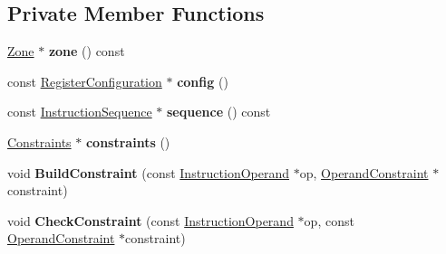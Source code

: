\subsection*{Private Member Functions}
\begin{DoxyCompactItemize}
\item 
\hyperlink{classv8_1_1internal_1_1_zone}{Zone} $\ast$ {\bfseries zone} () const \hypertarget{classv8_1_1internal_1_1compiler_1_1_register_allocator_verifier_a4906ddee483016d5bf8f46fd077032f7}{}\label{classv8_1_1internal_1_1compiler_1_1_register_allocator_verifier_a4906ddee483016d5bf8f46fd077032f7}

\item 
const \hyperlink{classv8_1_1internal_1_1_register_configuration}{Register\+Configuration} $\ast$ {\bfseries config} ()\hypertarget{classv8_1_1internal_1_1compiler_1_1_register_allocator_verifier_ae467b5a1da6be846a0c76ad7051b150e}{}\label{classv8_1_1internal_1_1compiler_1_1_register_allocator_verifier_ae467b5a1da6be846a0c76ad7051b150e}

\item 
const \hyperlink{classv8_1_1internal_1_1compiler_1_1_instruction_sequence}{Instruction\+Sequence} $\ast$ {\bfseries sequence} () const \hypertarget{classv8_1_1internal_1_1compiler_1_1_register_allocator_verifier_a3f184dbb2f398b72cb6ab80ada2e0baf}{}\label{classv8_1_1internal_1_1compiler_1_1_register_allocator_verifier_a3f184dbb2f398b72cb6ab80ada2e0baf}

\item 
\hyperlink{classv8_1_1internal_1_1_zone_vector}{Constraints} $\ast$ {\bfseries constraints} ()\hypertarget{classv8_1_1internal_1_1compiler_1_1_register_allocator_verifier_a51dda432132992020f0405a173bc87fd}{}\label{classv8_1_1internal_1_1compiler_1_1_register_allocator_verifier_a51dda432132992020f0405a173bc87fd}

\item 
void {\bfseries Build\+Constraint} (const \hyperlink{classv8_1_1internal_1_1compiler_1_1_instruction_operand}{Instruction\+Operand} $\ast$op, \hyperlink{structv8_1_1internal_1_1compiler_1_1_register_allocator_verifier_1_1_operand_constraint}{Operand\+Constraint} $\ast$constraint)\hypertarget{classv8_1_1internal_1_1compiler_1_1_register_allocator_verifier_abf7773216181a4e5da1f4392144012e7}{}\label{classv8_1_1internal_1_1compiler_1_1_register_allocator_verifier_abf7773216181a4e5da1f4392144012e7}

\item 
void {\bfseries Check\+Constraint} (const \hyperlink{classv8_1_1internal_1_1compiler_1_1_instruction_operand}{Instruction\+Operand} $\ast$op, const \hyperlink{structv8_1_1internal_1_1compiler_1_1_register_allocator_verifier_1_1_operand_constraint}{Operand\+Constraint} $\ast$constraint)\hypertarget{classv8_1_1internal_1_1compiler_1_1_register_allocator_verifier_af3a878e7c82e41d60be16c1ddf784cc3}{}\label{classv8_1_1internal_1_1compiler_1_1_register_allocator_verifier_af3a878e7c82e41d60be16c1ddf784cc3}


\end{DoxyCompactItemize}
